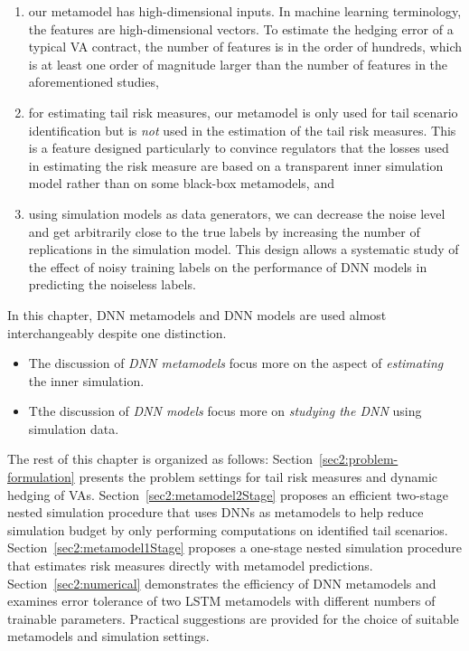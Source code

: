 \begin{enumerate}
    \item  our metamodel has high-dimensional inputs. In machine learning terminology, the features are high-dimensional vectors.
    To estimate the hedging error of a typical VA contract, the number of features is in the order of hundreds, which is at least one order of magnitude larger than the number of features in the aforementioned studies,
    \item  for estimating tail risk measures, our metamodel is only used for tail scenario identification but is \textit{not} used in the estimation of the tail risk measures.
    This is a feature designed particularly to convince regulators that the losses used in estimating the risk measure are based on a transparent inner simulation model rather than on some black-box metamodels, and
    \item  using simulation models as data generators, we can decrease the noise level and get arbitrarily close to the true labels by increasing the number of replications in the simulation model.
    This design allows a systematic study of the effect of noisy training labels on the performance of DNN models in predicting the noiseless labels.
\end{enumerate}

In this chapter, DNN metamodels and DNN models are used almost interchangeably despite one distinction.
\begin{itemize}
    \item The discussion of \textit{DNN metamodels} focus more on the aspect of \textit{estimating} the inner simulation.
    \item Tthe discussion of \textit{DNN models} focus more on \textit{studying the DNN} using simulation data.
\end{itemize}

The rest of this chapter is organized as follows: 
Section~\ref{sec2:problem-formulation} presents the problem settings for tail risk measures and dynamic hedging of VAs. 
Section~\ref{sec2:metamodel2Stage} proposes an efficient two-stage nested simulation procedure that uses DNNs as metamodels to help reduce simulation budget by only performing computations on identified tail scenarios. 
Section~\ref{sec2:metamodel1Stage} proposes a one-stage nested simulation procedure that estimates risk measures directly with metamodel predictions.
Section~\ref{sec2:numerical} demonstrates the efficiency of DNN metamodels and examines error tolerance of two LSTM metamodels with different numbers of trainable parameters. 
Practical suggestions are provided for the choice of suitable metamodels and simulation settings. 

